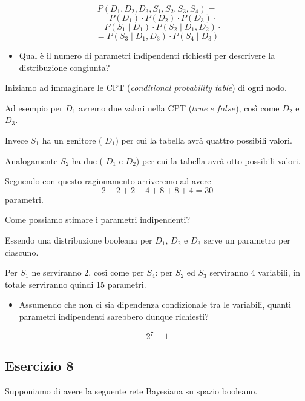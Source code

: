 \documentclass{article}
\begin{document}
\[P(D_1, D_2, D_3, S_1, S_2, S_3, S_4) = \]
\[= P(D_1) \cdot P(D_2) \cdot P(D_3) \cdot    \]
\[= P(S_1 \;|\; D_1) \cdot  P(S_2 \;|\; D_1, D_2)\cdot    \]
\[= P(S_3 \;|\; D_1, D_3) \cdot  P(S_4 \;|\; D_3)  \]


 \begin{itemize}
	\item Qual è il numero di parametri indipendenti richiesti per descrivere la distribuzione congiunta?
\end{itemize}

Iniziamo ad immaginare le CPT (\textit{conditional probability table}) di ogni nodo.

Ad esempio per \(D_1\) avremo due valori nella CPT (\(true\; e\; false\)), così come  \(D_2\) e  \(D_3\).

Invece  \(S_1\) ha un genitore  ( \(D_1\)) per cui la tabella avrà quattro possibili valori.

Analogamente  \(S_2\) ha due  ( \(D_1\) e \(D_2\)) per cui la tabella avrà otto possibili valori.

Seguendo con questo ragionamento arriveremo ad avere
\[2 + 2 + 2 + 4 + 8 + 8 + 4 = 30\] parametri.

Come possiamo stimare i parametri indipendenti?

Essendo una distribuzione booleana per \(D_1\), \(D_2\) e \(D_3\) serve un parametro per ciascuno.

Per  \(S_1\) ne serviranno 2, così come per \(S_4\): per \(S_2\) ed \(S_3\) serviranno 4 variabili, in totale serviranno quindi 15 parametri.

 \begin{itemize}
	\item Assumendo che non ci sia dipendenza condizionale tra le variabili, quanti parametri indipendenti sarebbero
	dunque richiesti?
\end{itemize}

\[2^7 -1\]

\pagebreak

\subsection{Esercizio 8}

Supponiamo di avere la seguente rete Bayesiana su spazio booleano.

 \begin{center}
\end{center}
\end{document}
